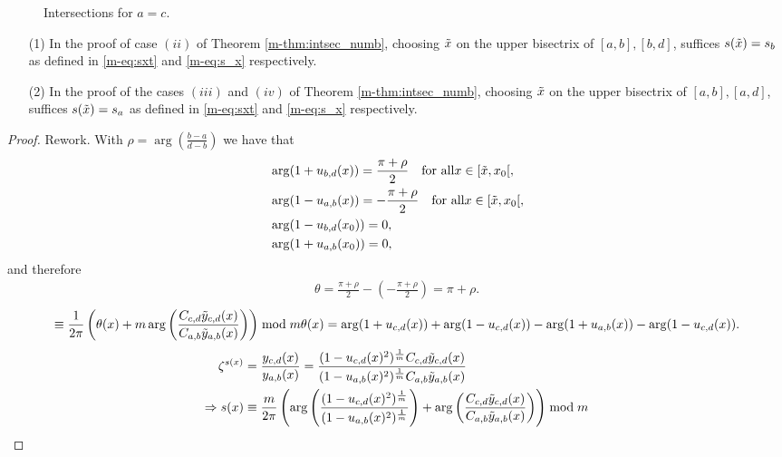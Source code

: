 \documentclass[main.tex]{subfiles}
\begin{document}
  \begin{figure}[H]
      \begin{center}
   \scalebox{0.9}{}
      \end{center}
    \caption{Intersections for $a=c$.}
    \label{fig:int_b=c}
   \end{figure}
 
 
  
\begin{lemma}\label{lemma:sxt=sx}
  \begin{itemize}
   \item[(1)] In the proof of case $(ii)$ of Theorem \ref{m-thm:intsec_numb}, choosing $\tilde{x}$ on the upper bisectrix
   of $[a,b],[b,d]$, suffices $s(\tilde{x}) = s_b$ as defined in \eqref{m-eq:sxt} and \eqref{m-eq:s_x} respectively.
    \item[(2)] In the proof of the cases $(iii)$ and $(iv)$ of Theorem \ref{m-thm:intsec_numb}, choosing $\tilde{x}$ on the upper bisectrix
   of $[a,b],[a,d]$, suffices $s(\tilde{x}) = s_a$ as defined in \eqref{m-eq:sxt} and \eqref{m-eq:s_x} respectively.
  \end{itemize}
\end{lemma}
 \begin{proof}
 \todo Rework.
  With $\rho = \arg\left(\frac{b-a}{d-b}\right)$ we have that
  \begin{align*}
   & \arg (1+u_{b,d}(x)) = \frac{\pi+\rho}{2} \quad \text{for all}  x \in [\tilde{x},x_0[,\\
   & \arg (1-u_{a,b}(x)) = -\frac{\pi+\rho}{2} \quad \text{for all}  x \in [\tilde{x},x_0[,\\
   & \arg (1-u_{b,d}(x_0)) = 0,\\
   & \arg (1+u_{a,b}(x_0))= 0,
  \end{align*}
  and therefore
  \begin{align*}
   \theta = \frac{\pi+\rho}{2} - \left(-\frac{\pi+\rho}{2}\right) = \pi + \rho.
  \end{align*}
  \begin{equation}
   \equiv \frac{1}{2\pi}\left( \theta(x) + m \arg \left( \frac{ C_{c,d} \tilde{y}_{c,d}(x)}{ C_{a,b}
   \tilde{y}_{a,b}(x)} \right) \right) \bmod m
   \theta(x) = \arg(1+u_{c,d}(x)) + \arg(1-u_{c,d}(x)) - \arg(1+u_{a,b}(x)) - \arg(1-u_{c,d}(x)).
  \end{equation}
    \begin{align}\label{eq:s(x)2}
  \begin{split}
   \zeta^{s(x)} & = \frac{y_{c,d}(x)}{y_{a,b}(x)} = \frac{(1- u_{c,d}(x)^2)^{\frac{1}{m}} C_{c,d} \tilde{y}_{c,d}(x) }{(1-u_{a,b}(x)^2)^{\frac{1}{m}} C_{a,b} \tilde{y}_{a,b}(x)} \\
   \Rightarrow  s(x) & \equiv \frac{m}{2\pi} \left( \arg \left( \frac{(1- u_{c,d}(x)^2)^{\frac{1}{m}}}{(1-u_{a,b}(x)^2)^{\frac{1}{m}}} \right) + \arg \left( \frac{ C_{c,d} \tilde{y}_{c,d}(x)}{ C_{a,b}
   \tilde{y}_{a,b}(x)} \right) \right) \bmod m
  \end{split}
  \end{align}
 \end{proof}
\end{document}
